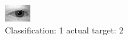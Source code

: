 \begin{figure}[h!]
\begin{center}
\includegraphics[width=0.60\columnwidth]{figures/ID381_class_1_target_2.png}
\end{center}
\caption{ Classification: 1 actual target: 2}
\label{fig:ID381_class_1_target_2}
\end{figure}
